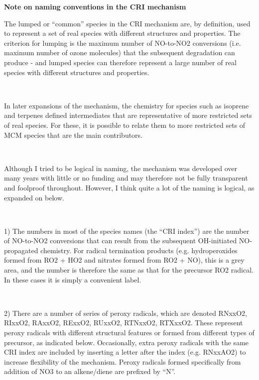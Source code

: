 \textbf{Note on naming conventions in the CRI mechanism}\\

{\selectfont \parbox{\textwidth}{
The lumped or “common” species in the CRI mechanism are, by definition, used to represent a set of real species with different structures and properties. The criterion for lumping is the maximum number of NO-to-NO2 conversions (i.e. maximum number of ozone molecules) that the subsequent degradation can produce - and lumped species can therefore represent a large number of real species with different structures and properties.
\\}\\ \parbox{\textwidth}{
In later expansions of the mechanism, the chemistry for species such as isoprene and terpenes defined intermediates that are representative of more restricted sets of real species. For these, it is possible to relate them to more restricted sets of MCM species that are the main contributors.
\\}\\ \parbox{\textwidth}{
Although I tried to be logical in naming, the mechanism was developed over many years with little or no funding and may therefore not be fully transparent and foolproof throughout. However, I think quite a lot of the naming is logical, as expanded on below.
\\}\\ \parbox{\textwidth}{
1) The numbers in most of the species names (the “CRI index”) are the number of NO-to-NO2 conversions that can result from the subsequent OH-initiated NO-propagated chemistry. For radical termination products (e.g. hydroperoxides formed from RO2 + HO2 and nitrates formed from RO2 + NO), this is a grey area, and the number is therefore the same as that for the precursor RO2 radical. In these cases it is simply a convenient label.
\\}\\ \parbox{\textwidth}{
2) There are a number of series of peroxy radicals, which are denoted RNxxO2, RIxxO2, RAxxO2, RExxO2, RUxxO2, RTNxxO2, RTXxxO2. These represent peroxy radicals with different structural features or formed from different types of precursor, as indicated below. Occasionally, extra peroxy radicals with the same CRI index are included by inserting a letter after the index (e.g. RNxxAO2) to increase flexibility of the mechanism. Peroxy radicals formed specifically from addition of NO3 to an alkene/diene are prefixed by “N”.
\\}\\ \parbox{\textwidth}{
}}
